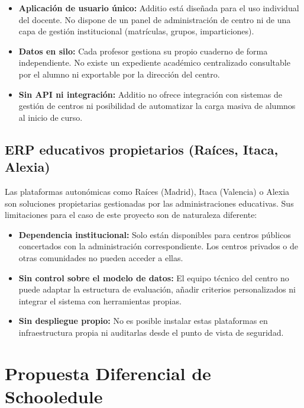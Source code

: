 \documentclass[12pt, a4paper]{report}
\begin{document}
\begin{itemize}
  \item \textbf{Aplicación de usuario único:} Additio está diseñada para el uso
        individual del docente. No dispone de un panel de administración de centro
        ni de una capa de gestión institucional (matrículas, grupos, imparticiones).
  \item \textbf{Datos en silo:} Cada profesor gestiona su propio cuaderno de forma
        independiente. No existe un expediente académico centralizado consultable
        por el alumno ni exportable por la dirección del centro.
  \item \textbf{Sin API ni integración:} Additio no ofrece integración con sistemas
        de gestión de centros ni posibilidad de automatizar la carga masiva de alumnos
        al inicio de curso.
\end{itemize}

\subsection{ERP educativos propietarios (Raíces, Itaca, Alexia)}

Las plataformas autonómicas como Raíces (Madrid), Itaca (Valencia) o Alexia son
soluciones propietarias gestionadas por las administraciones educativas. Sus
limitaciones para el caso de este proyecto son de naturaleza diferente:

\begin{itemize}
  \item \textbf{Dependencia institucional:} Solo están disponibles para centros
        públicos concertados con la administración correspondiente. Los centros
        privados o de otras comunidades no pueden acceder a ellas.
  \item \textbf{Sin control sobre el modelo de datos:} El equipo técnico del centro
        no puede adaptar la estructura de evaluación, añadir criterios personalizados
        ni integrar el sistema con herramientas propias.
  \item \textbf{Sin despliegue propio:} No es posible instalar estas plataformas
        en infraestructura propia ni auditarlas desde el punto de vista de seguridad.
\end{itemize}

\section{Propuesta Diferencial de Schooledule}
\end{document}
